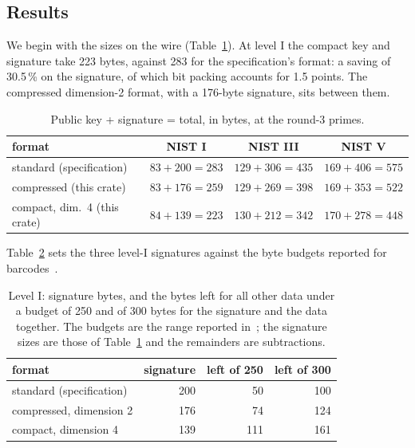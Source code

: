 \documentclass[version=preprint]{iacrcc}
\begin{document}
    \subsection{Results}
    \label{sec:results}
    We begin with the sizes on the wire (Table~\ref{tab:sizes}). At level I
    the compact key and signature take 223 bytes, against 283 for the
    specification's format: a saving of 30.5\,\% on the signature, of which
    bit packing accounts for 1.5 points. The compressed
    dimension-2 format, with a 176-byte signature, sits between them.

    \begin{table}[t]
        \centering
        \begin{threeparttable}
            \caption{Public key + signature = total, in bytes, at the round-3
                primes.}
            \label{tab:sizes}
            \footnotesize
            \setlength{\tabcolsep}{3.5pt}
            \begin{tabular}{l c c c}
                \toprule
                format & NIST I & NIST III & NIST V \\
                \midrule
                standard (specification) & $83 + 200 = 283$ & $129 + 306 = 435$ & $169 + 406 = 575$ \\
                compressed (this crate) & $83 + 176 = 259$ & $129 + 269 = 398$ & $169 + 353 = 522$ \\
                compact, dim.\ 4 (this crate) & $84 + 139 = 223$ & $130 + 212 = 342$ & $170 + 278 = 448$ \\
                
                \bottomrule
            \end{tabular}
        \end{threeparttable}
    \end{table}

    Table~\ref{tab:budget} sets the three level-I signatures against the
    byte budgets reported for barcodes~\cite{SQI26i19}.

    \begin{table}[t]
        \centering
        \caption{Level I: signature bytes, and the bytes left for all other
            data under a budget of 250 and of 300 bytes for the signature and
            the data together. The budgets are the range reported
            in~\cite{SQI26i19}; the signature sizes are those of
            Table~\ref{tab:sizes} and the remainders are subtractions.}
        \label{tab:budget}
        \begin{tabular}{l r r r}
            \toprule
            format & signature & left of 250 & left of 300 \\
            \midrule
            standard (specification) & 200 & 50 & 100 \\
            compressed, dimension 2 & 176 & 74 & 124 \\
            compact, dimension 4 & 139 & 111 & 161 \\
            \bottomrule
        \end{tabular}
    \end{table}
\end{document}
